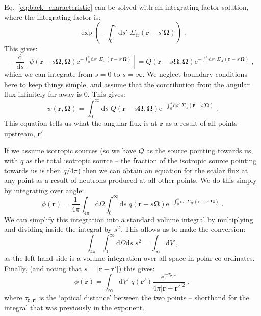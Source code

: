 \documentclass{article}
\begin{document}
Eq.~\eqref{eq:back_characteristic} can be solved with an integrating factor solution, where the integrating factor is:
\begin{equation}
    \exp\left(-\int^s_0 \mathrm{d}s' \;\Sigma_\mathrm{tr}(\mathbf{r}-s'\mathbf{\Omega})\right)\;\mathrm{.}
\end{equation}
This gives:
\begin{equation}
    -\frac{\mathrm{d}}{\mathrm{d}s}\left[\psi(\mathbf{r}-s\mathbf{\Omega},\mathbf{\Omega})\mathrm{e}^{-\int^s_0 \mathrm{d}s' \;\Sigma_\mathrm{tr}(\mathbf{r}-s'\mathbf{\Omega})}\right]=Q(\mathbf{r}-s\mathbf{\Omega},\mathbf{\Omega})\mathrm{e}^{-\int^s_0 \mathrm{d}s' \;\Sigma_\mathrm{tr}(\mathbf{r}-s'\mathbf{\Omega})}\;\mathrm{,}
\end{equation}
which we can integrate from $s = 0$ to $s = \infty$. We neglect boundary conditions here to keep things simple, and assume that the contribution from the angular flux infinitely far away is 0. This gives:
\begin{equation}
    \psi(\mathbf{r},\mathbf{\Omega}) = \int^\infty_0\mathrm{d}s\;Q(\mathbf{r}-s\mathbf{\Omega},\mathbf{\Omega})\mathrm{e}^{-\int^s_0 \mathrm{d}s' \;\Sigma_\mathrm{tr}(\mathbf{r}-s'\mathbf{\Omega})}\;\mathrm{.}
\end{equation}
This equation tells us what the angular flux is at $\mathbf{r}$ as a result of all points upstream, $\mathbf{r}'$. 

If we assume isotropic sources (so we have $Q$ as the source pointing towards us, with $q$ as the total isotropic source -- the fraction of the isotropic source pointing towards us is then $q/4\pi$) then we can obtain an equation for the scalar flux at any point as a result of neutrons produced at all other points. We do this simply by integrating over angle:
\begin{equation}
    \phi(\mathbf{r}) = \frac{1}{4\pi}\int_{4\pi}\mathrm{d}\Omega \int^{\infty}_0\mathrm{d}s\; q(\mathbf{r}-s\mathbf{\Omega})\mathrm{e}^{-\int^s_0\mathrm{d}s'\Sigma_\mathrm{tr}(\mathbf{r}-s'\mathbf{\Omega})}\;\mathrm{.}
\end{equation}
We can simplify this integration into a standard volume integral by multiplying and dividing inside the integral by $s^2$. This allows us to make the conversion:
\begin{equation}
    \int_{4\pi}\int^\infty_0 \mathrm{d}\Omega \mathrm{d}s \;s^2 = \int_\infty \mathrm{d}V \;\mathrm{,}
\end{equation}
as the left-hand side is a volume integration over all space in polar co-ordinates. Finally, (and noting that $s = |\mathbf{r} - \mathbf{r}'|$) this gives:
\begin{equation}\label{eq:integral}
    \phi(\mathbf{r}) = \int_{\infty}\mathrm{d}V'\; q(\mathbf{r}')\frac{\mathrm{e}^{-\tau_{\mathbf{r},\mathbf{r}'}}}{4\pi |\mathbf{r}-\mathbf{r}'|^2}\;\mathrm{,}
\end{equation}
where $\tau_{\mathbf{r},\mathbf{r}'}$ is the `optical distance' between the two points -- shorthand for the integral that was previously in the exponent.
\end{document}
